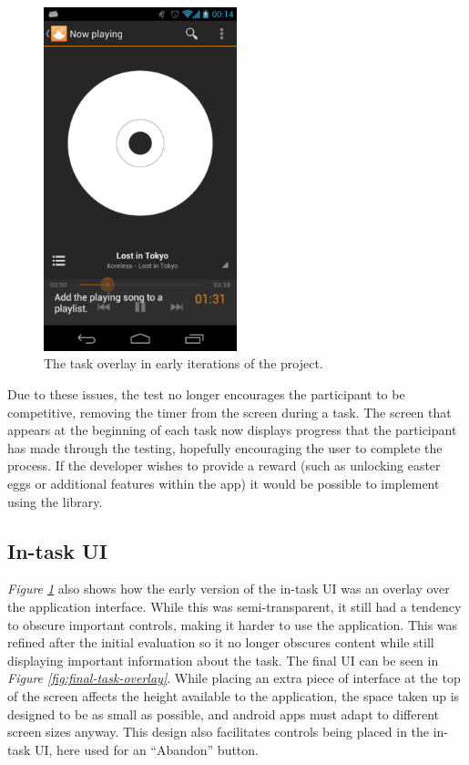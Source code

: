 \begin{figure}[ht!]
  \centering 
  \includegraphics[width=0.5\textwidth]{images/time-taken}
  \caption{The task overlay in early iterations of the project.}
  \label{fig:initial-overlay}
\end{figure}

Due to these issues, the test no longer encourages
the participant to be competitive, removing the timer from the screen during a task. The screen that appears at the beginning of each task now displays
progress that the participant has made through the testing, hopefully encouraging
the user to complete the process. If the developer wishes to provide a reward (such as
unlocking easter eggs or additional features within the app) it would be possible to implement using
the library.

\subsection{In-task UI}

\emph{Figure \ref{fig:initial-overlay}} also shows how the early version of the in-task UI was an overlay over the application interface. While this was semi-transparent, it still had a tendency to obscure important controls, making it harder to use the application. This was refined after the initial evaluation so it no longer obscures content while still displaying important information about the task. The final UI can be seen in \emph{Figure \ref{fig:final-task-overlay}}. While placing an extra piece of interface at the top of the screen affects the height available to the application, the space taken up is designed to be as small as possible, and android apps must adapt to different screen sizes anyway. This design also facilitates controls being placed in the in-task UI, here used for an ``Abandon'' button.

